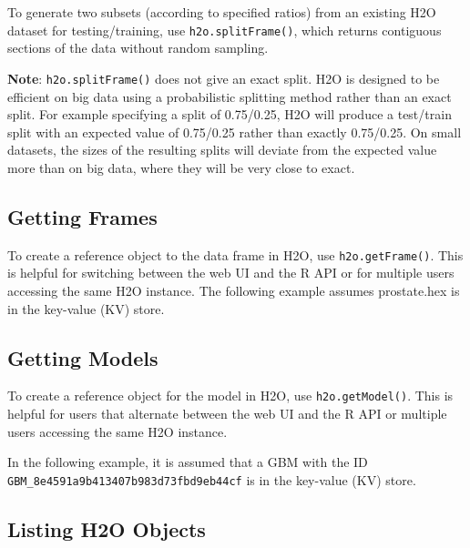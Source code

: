 {{To generate two subsets (according to specified ratios) from an existing H2O dataset for testing/training, use {\texttt{h2o.splitFrame()}}, which returns contiguous sections of the data without random sampling.

{\bf{Note}}: {\texttt{h2o.splitFrame()}} does not give an exact split. H2O is designed to be efficient on big data using a probabilistic splitting method rather than an exact split. For example specifying a split of 0.75/0.25, H2O will produce a test/train split with an expected value of 0.75/0.25 rather than exactly 0.75/0.25. On small datasets, the sizes of the resulting splits will deviate from the expected value more than on big data, where they will be very close to exact.

\newpage
\waterExampleInR
\medskip



\subsection{Getting Frames}


To create a reference object to the data frame in H2O, use {\texttt{h2o.getFrame()}}. This is helpful for  switching between the web UI and the R API or for multiple users accessing the same H2O instance. The following example assumes prostate.hex is in the key-value (KV) store.

\waterExampleInR
\medskip



\subsection{Getting Models}


To create a reference object for the model in H2O, use {\texttt{h2o.getModel()}}. This is helpful for  users that alternate between the web UI and the R API or multiple users accessing the same H2O instance. 

In the following example, it is assumed that a GBM with the ID \texttt{GBM\_8e4591a9b413407b983d73fbd9eb44cf} is in the key-value (KV) store.

\waterExampleInR
\medskip


\subsection{Listing H2O Objects}

}}
